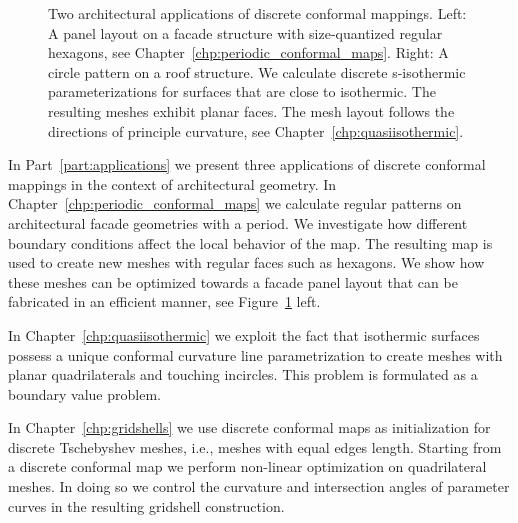 \documentclass[Thesis.tex]{subfiles}
\begin{document}
\begin{figure}
\centering
{}
\caption{
Two architectural applications of discrete conformal mappings. 
Left: A panel layout on a facade structure with size-quantized regular hexagons, see Chapter~\ref{chp:periodic_conformal_maps}.
Right: A circle pattern on a roof structure. 
We calculate discrete s-isothermic parameterizations for surfaces that are close to isothermic.
The resulting meshes exhibit planar faces. 
The mesh layout follows the directions of principle curvature, see Chapter~\ref{chp:quasiisothermic}.
}
\label{fig:intro_applications} 
\end{figure}

In Part~\ref{part:applications} we present three applications of discrete conformal mappings in the context of architectural geometry. 
In Chapter~\ref{chp:periodic_conformal_maps} we calculate regular patterns on architectural facade geometries with a period. 
We investigate how different boundary conditions affect the local behavior of the map.
The resulting map is used to create new meshes with regular faces such as hexagons.
We show how these meshes can be optimized towards a facade panel layout that can be fabricated in an efficient manner, see Figure~\ref{fig:intro_applications} left.

In Chapter~\ref{chp:quasiisothermic} we exploit the fact that isothermic surfaces possess a unique conformal curvature line parametrization to create meshes with planar quadrilaterals and touching incircles. 
This problem is formulated as a boundary value problem. 

In Chapter~\ref{chp:gridshells} we use discrete conformal maps as initialization for discrete Tschebyshev meshes, i.e., meshes with equal edges length. 
Starting from a discrete conformal map we perform non-linear optimization on quadrilateral meshes.
In doing so we control the curvature and intersection angles of parameter curves in the resulting gridshell construction.
\end{document}
